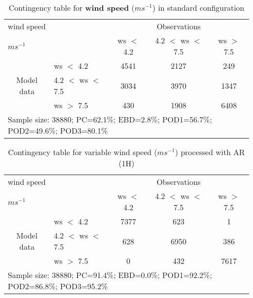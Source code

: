 \documentclass[11pt,english]{article}
\begin{document}
\clearpage
\begin{table}[]
\begin{center}
\begin{tabular}{llccc}
\hline
{wind speed}                                       &                                                    & \multicolumn{3}{c}{Observations}                 \\
{$m s^{-1}$}                                       &                             & ws $<$ 4.2   & 4.2 $<$ ws $<$ 7.5 & ws $>$ 7.5 \\
\hline
\multicolumn{1}{c}{\multirow{3}{*}{Model data}}  & ws $<$ 4.2             & 4541                & 2127                       & 249              \\
                                                 & 4.2  $<$ ws $<$ 7.5 & 3034                & 3970                       & 1347              \\
                                                 & ws $>$ 7.5             & 430                & 1908                       & 6408              \\
\hline 
\multicolumn{5}{l}{Sample size: 38880; PC=62.1\%; EBD=2.8\%; POD1=56.7\%; POD2=49.6\%; POD3=80.1\%}                 \\
\end{tabular}
\end{center}
\caption{Contingency table for \textbf{wind speed} ($m s^{-1}$) in standard configuration}
\label{tab:contingencywsBEF}
\end{table}
\begin{table}[]
\begin{center}
\begin{tabular}{llccc}
\hline
{wind speed}                                       &                                                    & \multicolumn{3}{c}{Observations}                 \\
{$m s^{-1}$}                                       &                             & ws $<$ 4.2   & 4.2 $<$ ws $<$ 7.5 & ws $>$ 7.5 \\
\hline
\multicolumn{1}{c}{\multirow{3}{*}{Model data}}  & ws $<$ 4.2             & 7377                & 623                       & 1              \\
                                                 & 4.2  $<$ ws $<$ 7.5 & 628                & 6950                       & 386              \\
                                                 & ws $>$ 7.5             & 0                & 432                       & 7617              \\
\hline 
\multicolumn{5}{l}{Sample size: 38880; PC=91.4\%; EBD=0.0\%; POD1=92.2\%; POD2=86.8\%; POD3=95.2\%}                 \\
\end{tabular}
\end{center}
\caption{Contingency table for variable wind speed ($m s^{-1}$) processed with AR (1H)}
\label{tab:contingencywsAFT}
\end{table}
\end{document}
